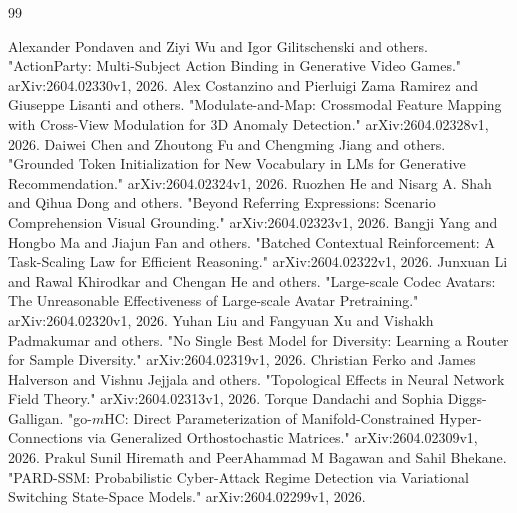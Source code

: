 \documentclass[11pt,a4paper]{article}
\begin{document}
\begin{thebibliography}{99}

 Alexander Pondaven and Ziyi Wu and Igor Gilitschenski and others. "ActionParty: Multi-Subject Action Binding in Generative Video Games." arXiv:2604.02330v1, 2026.
 Alex Costanzino and Pierluigi Zama Ramirez and Giuseppe Lisanti and others. "Modulate-and-Map: Crossmodal Feature Mapping with Cross-View Modulation for 3D Anomaly Detection." arXiv:2604.02328v1, 2026.
 Daiwei Chen and Zhoutong Fu and Chengming Jiang and others. "Grounded Token Initialization for New Vocabulary in LMs for Generative Recommendation." arXiv:2604.02324v1, 2026.
 Ruozhen He and Nisarg A. Shah and Qihua Dong and others. "Beyond Referring Expressions: Scenario Comprehension Visual Grounding." arXiv:2604.02323v1, 2026.
 Bangji Yang and Hongbo Ma and Jiajun Fan and others. "Batched Contextual Reinforcement: A Task-Scaling Law for Efficient Reasoning." arXiv:2604.02322v1, 2026.
 Junxuan Li and Rawal Khirodkar and Chengan He and others. "Large-scale Codec Avatars: The Unreasonable Effectiveness of Large-scale Avatar Pretraining." arXiv:2604.02320v1, 2026.
 Yuhan Liu and Fangyuan Xu and Vishakh Padmakumar and others. "No Single Best Model for Diversity: Learning a Router for Sample Diversity." arXiv:2604.02319v1, 2026.
 Christian Ferko and James Halverson and Vishnu Jejjala and others. "Topological Effects in Neural Network Field Theory." arXiv:2604.02313v1, 2026.
 Torque Dandachi and Sophia Diggs-Galligan. "go-$m$HC: Direct Parameterization of Manifold-Constrained Hyper-Connections via Generalized Orthostochastic Matrices." arXiv:2604.02309v1, 2026.
 Prakul Sunil Hiremath and PeerAhammad M Bagawan and Sahil Bhekane. "PARD-SSM: Probabilistic Cyber-Attack Regime Detection via Variational Switching State-Space Models." arXiv:2604.02299v1, 2026.

\end{thebibliography}
\end{document}
